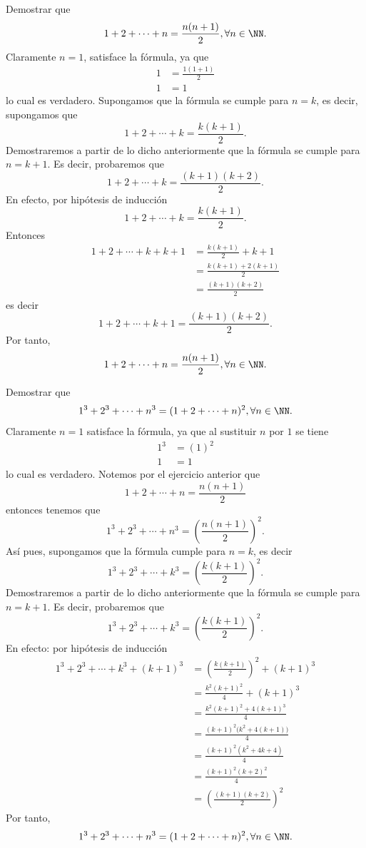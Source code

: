 \begin{examplebox}{}{}
    Demostrar que
    $$1+2+\cdots +n=\frac{n(n+1)}{2}, \forall n \in \NN.$$
    \demostracion Claramente $n=1$, satisface la fórmula, ya que
    \begin{align*}
        1 &=\frac{1(1+1)}{2} \\
        1 &=1
    \end{align*}
    lo cual es verdadero. Supongamos que la fórmula se cumple para $n=k$, es decir, supongamos que
    $$1+2+\cdots +k=\frac{k(k+1)}{2}.$$
    Demostraremos a partir de lo dicho anteriormente que la fórmula se cumple para $n=k+1$. Es decir, probaremos que
    $$1+2+\cdots +k=\frac{(k+1)(k+2)}{2}.$$
    En efecto, por hipótesis de inducción
    $$1+2+\cdots +k=\frac{k(k+1)}{2}.$$
    Entonces
    \begin{align*}
        1+2+\cdots +k+k+1 &=\frac{k(k+1)}{2}+k+1 \\
        &=\frac{k(k+1)+2(k+1)}{2} \\
        &=\frac{(k+1)(k+2)}{2}
    \end{align*}
    es decir
    $$1+2+\cdots +k+1=\frac{(k+1)(k+2)}{2}.$$
    Por tanto,
    $$1+2+\cdots +n=\frac{n(n+1)}{2}, \forall n \in \NN.$$
\end{examplebox}

\newpage

\begin{examplebox}{}{}
    Demostrar que
    $$1^3+2^3+\cdots +n^3=(1+2 +\cdots +n)^2, \forall n \in \NN.$$
    \demostracion Claramente $n=1$ satisface la fórmula, ya que al sustituir $n$ por $1$ se tiene
    \begin{align*}
        1^3 &=(1)^2 \\
        1 &=1
    \end{align*}
    lo cual es verdadero. Notemos por el ejercicio anterior que
    $$1+2+\cdots +n=\frac{n(n+1)}{2}$$
    entonces tenemos que
    $$1^3+2^3+\cdots +n^3=\left( \frac{n(n+1)}{2} \right)^2.$$
    Así pues, supongamos que la fórmula cumple para $n=k$, es decir
    $$1^3+2^3+\cdots +k^3=\left( \frac{k(k+1)}{2} \right)^2.$$
    Demostraremos a partir de lo dicho anteriormente que la fórmula se cumple para $n=k+1$. Es decir, probaremos que
    $$1^3+2^3+\cdots +k^3=\left( \frac{k(k+1)}{2} \right)^2.$$
    En efecto: por hipótesis de inducción
    \begin{align*}
        1^3 +2^3+ \cdots +k^3+(k+1)^3 &=\left( \frac{k(k+1)}{2} \right)^2 +(k+1)^3\\
        &=\frac{k^2(k+1)^2}{4}+(k+1)^3 \\
        &=\frac{k^2(k+1)^2+4(k+1)^3}{4} \\
        &=\frac{(k+1)^2\big(k^2+4(k+1)\big)}{4} \\
        &=\frac{(k+1)^2 (k^2+4k+4)}{4} \\
        &=\frac{(k+1)^2(k+2)^2}{4} \\
        &=\left(\frac{(k+1)(k+2)}{2}\right)^2
    \end{align*}
    Por tanto,
    $$1^3+2^3+\cdots +n^3=(1+2+\cdots +n)^2, \forall n \in \NN.$$
\end{examplebox}

